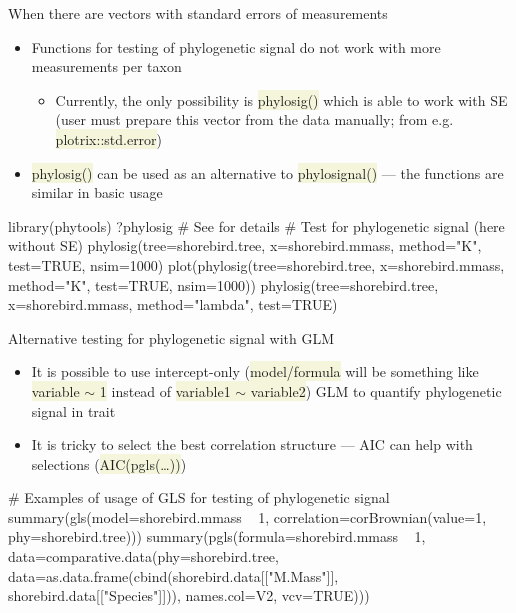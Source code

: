 \documentclass[compress, xelatex, 11pt, xcolor=svgnames, aspectratio=169,
	hyperref={
		bookmarks=true,
		unicode=true,
		colorlinks=true,
		pdftitle={Molecular data in R},
		plainpages=false,
		pdfauthor={Vojtech Zeisek},
		pdfsubject={Course about phylogeny and evolution in R},
		pdfcreator={XeLaTeX},
		pdfkeywords={R, evolution, phylogeny, molecular data},
		linkcolor=Crimson, %
		anchorcolor=Magenta, %
		citecolor=Magenta, %
		filecolor=Magenta, %
		menucolor=Magenta, %
		urlcolor=DodgerBlue, %
		},
	url={hyphens, lowtilde} %
	]{beamer}
\renewcommand{\texttt}[1]{\colorbox{Beige}{{\ttfamily #1}}}
\begin{document}
\begin{frame}[fragile]{When there are vectors with standard errors of measurements}
	\begin{itemize}
		\item Functions for testing of phylogenetic signal do not work with more measurements per taxon
		\begin{itemize}
			\item Currently, the only possibility is \texttt{phylosig()} which is able to work with SE (user must prepare this vector from the data manually; from e.g. \texttt{plotrix::std.error})
		\end{itemize}
		\item \texttt{phylosig()} can be used as an alternative to \texttt{phylosignal()} --- the functions are similar in basic usage
	\end{itemize}
	\begin{spluscode}
    library(phytools)
    ?phylosig # See for details
    # Test for phylogenetic signal (here without SE)
    phylosig(tree=shorebird.tree, x=shorebird.mmass, method="K", test=TRUE,
      nsim=1000)
    plot(phylosig(tree=shorebird.tree, x=shorebird.mmass, method="K",
      test=TRUE, nsim=1000))
    phylosig(tree=shorebird.tree, x=shorebird.mmass, method="lambda",
      test=TRUE)
	\end{spluscode}
\end{frame}

\begin{frame}[fragile]{Alternative testing for phylogenetic signal with GLM}
	\begin{itemize}
		\item It is possible to use intercept-only (\texttt{model/formula} will be something like \texttt{variable $\sim$ 1} instead of \texttt{variable1 $\sim$ variable2}) GLM to quantify phylogenetic signal in trait
		\item It is tricky to select the best correlation structure --- AIC can help with selections (\texttt{AIC(pgls(\ldots))})
	\end{itemize}
	\begin{spluscode}
    # Examples of usage of GLS for testing of phylogenetic signal
    summary(gls(model=shorebird.mmass ~ 1,
      correlation=corBrownian(value=1, phy=shorebird.tree)))
    summary(pgls(formula=shorebird.mmass ~ 1,
      data=comparative.data(phy=shorebird.tree,
      data=as.data.frame(cbind(shorebird.data[["M.Mass"]],
      shorebird.data[["Species"]])), names.col=V2, vcv=TRUE)))
	\end{spluscode}
\end{frame}
\end{document}
